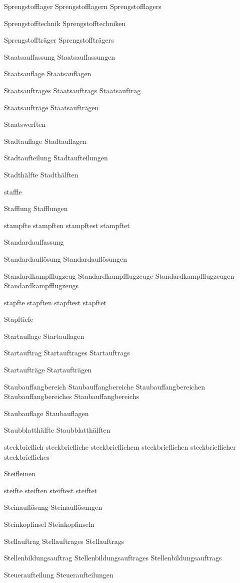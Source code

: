 Sprengstofflager
Sprengstofflagern
Sprengstofflagers

Sprengstofftechnik
Sprengstofftechniken

Sprengstoffträger
Sprengstoffträgers

Staatsauffassung
Staatsauffassungen

Staatsauflage
Staatsauflagen

Staatsauftrages
Staatsauftrags
Staatsauftrag

Staatsaufträge
Staatsaufträgen

Staatswerften

Stadtauflage
Stadtauflagen

Stadtaufteilung
Stadtaufteilungen

Stadthälfte
Stadthälften

staffle

Stafflung
Stafflungen

stampfte
stampften
stampftest
stampftet

Standardauffassung

Standardauflösung
Standardauflösungen

Standardkampfflugzeug
Standardkampfflugzeuge
Standardkampfflugzeugen
Standardkampfflugzeugs

stapfte
stapften
stapftest
stapftet

Stapftiefe

Startauflage
Startauflagen

Startauftrag
Startauftrages
Startauftrags

Startaufträge
Startaufträgen

Staubauffangbereich
Staubauffangbereiche
Staubauffangbereichen
Staubauffangbereiches
Staubauffangbereichs

Staubauflage
Staubauflagen

Staubblatthälfte
Staubblatthälften

steckbrieflich
steckbriefliche
steckbrieflichem
steckbrieflichen
steckbrieflicher
steckbriefliches

Steifleinen

steifte
steiften
steiftest
steiftet

Steinauflösung
Steinauflösungen

Steinkopfinsel
Steinkopfinseln

Stellauftrag
Stellauftrages
Stellauftrags

Stellenbildungsauftrag
Stellenbildungsauftrages
Stellenbildungsauftrags

Steueraufteilung
Steueraufteilungen


